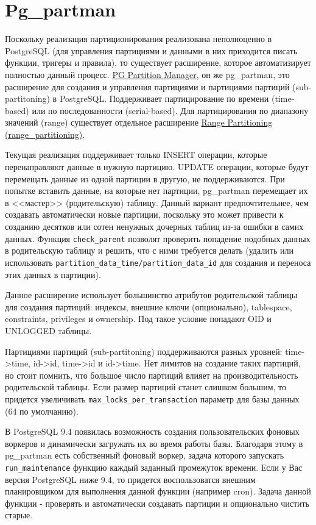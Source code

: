 \section{Pg\_partman}

Поскольку реализация партиционирования реализована неполноценно в PostgreSQL (для управления партициями и данными в них приходится писать функции, тригеры и правила), то существует расширение, которое автоматизирует полностью данный процесс. \href{https://github.com/keithf4/pg\_partman}{PG Partition Manager}, он же pg\_partman, это расширение для создания и управления партициями и партициями партиций (sub-partitoning) в PostgreSQL. Поддерживает партицирование по времени (time-based) или по последованности (serial-based). Для партицирования по диапазону значений (range) существует отдельное расширение \href{https://github.com/moat/range\_partitioning}{Range Partitioning (range\_partitioning)}.

Текущая реализация поддерживает только INSERT операции, которые перенаправляют данные в нужную партицию. UPDATE операции, которые будут перемещать данные из одной партиции в другую, не поддерживаются. При попытке вставить данные, на которые нет партиции, pg\_partman перемещает их в <<мастер>> (родительскую) таблицу. Данный вариант предпочтительнее, чем создавать автоматически новые партиции, поскольку это может привести к созданию десятков или сотен ненужных дочерных таблиц из-за ошибки в самих данных. Функция \lstinline!check_parent! позволят проверить попадение подобных данных в родительскую таблицу и решить, что с ними требуется делать (удалить или использовать \lstinline!partition_data_time/partition_data_id! для создания и переноса этих данных в партиции).

Данное расширение использует большинство атрибутов родительской таблицы для создания партиций: индексы, внешние ключи (опционально), tablespace, constraints, privileges и ownership. Под такое условие попадают OID и UNLOGGED таблицы.

Партициями партиций (sub-partitoning) поддерживаются разных уровней: time->time, id->id, time->id и id->time. Нет лимитов на создание таких партиций, но стоит помнить, что большое число партиций влияет на производительность родительской таблицы. Если размер партиций станет слишком большим, то придется увеличивать \lstinline!max_locks_per_transaction! параметр для базы данных (64 по умолчанию).

В PostgreSQL 9.4 появилась возможность создания пользовательских фоновых воркеров и динамически загружать их во время работы базы. Благодаря этому в pg\_partman есть собственный фоновый воркер, задача которого запускать \lstinline!run_maintenance! функцию каждый заданный промежуток времени. Если у Вас версия PostgreSQL ниже 9.4, то придется воспользоватся внешним планировщиком для выполнения данной функции (например cron). Задача данной функции - проверять и автоматически создавать партиции и опционально чистить старые.

